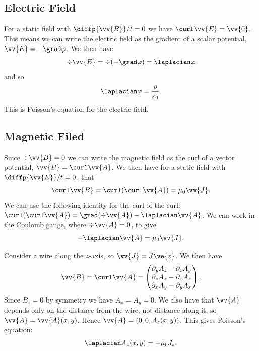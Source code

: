 \documentclass[fleqn]{NotesClass}
\begin{document}
    \subsection{Electric Field}
    For a static field with \(\diffp{\vv{B}}/{t} = 0\) we have \(\curl\vv{E} = \vv{0}\).
    This means we can write the electric field as the gradient of a scalar potential, \(\vv{E} = -\grad\varphi\).
    We then have
    \begin{equation}
        \div\vv{E} = \div(-\grad\varphi) = \laplacian\varphi
    \end{equation}
    and so
    \begin{equation}
        \laplacian\varphi = \frac{\rho}{\varepsilon_0}.
    \end{equation}
    This is Poisson's equation for the electric field.
    
    \subsection{Magnetic Filed}
    Since \(\div\vv{B} = 0\) we can write the magnetic field as the curl of a vector potential, \(\vv{B} = \curl\vv{A}\).
    We then have for a static field with \(\diffp{\vv{E}}/{t} = 0\), that
    \begin{equation}
        \curl\vv{B} = \curl(\curl\vv{A}) = \mu_0\vv{J}.
    \end{equation}
    We can use the following identity for the curl of the curl: \(\curl(\curl\vv{A}) = \grad(\div\vv{A}) - \laplacian\vv{A}\).
    We can work in the Coulomb gauge, where \(\div\vv{A} = 0\), to give
    \begin{equation}
        -\laplacian\vv{A} = \mu_0\vv{J}.
    \end{equation}
    
    Consider a wire along the \(z\)-axis, so \(\vv{J} = J\ve{z}\).
    We then have
    \begin{equation}
        \vv{B} = \curl\vv{A} = 
        \begin{pmatrix}
            \partial_y A_z - \partial_z A_y\\
            \partial_z A_x - \partial_x A_z\\
            \partial_x A_y - \partial_y A_x
        \end{pmatrix}
        .
    \end{equation}
    Since \(B_z = 0\) by symmetry we have \(A_x = A_y = 0\).
    We also have that \(\vv{A}\) depends only on the distance from the wire, not distance along it, so \(\vv{A} = \vv{A}(x, y)\).
    Hence \(\vv{A} = (0, 0, A_z(x, y))\).
    This gives Poisson's equation:
    \begin{equation}
        \laplacian A_z(x, y) = -\mu_0 J_z.
    \end{equation}
    
    
    
    
%        

\backmatter
\renewcommand{\glossaryname}{Acronyms}
\printglossary[acronym]
\printindex
\end{document}
